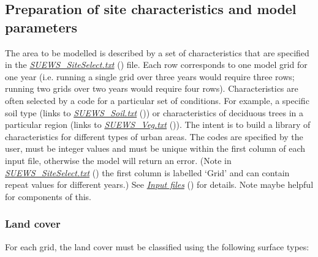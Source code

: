\documentclass[letterpaper,10pt,english]{sphinxmanual}
\begin{document}
\subsection{Preparation of site characteristics and model parameters}
\label{\detokenize{prepare-to-run-the-model:preparation-of-site-characteristics-and-model-parameters}}
The area to be modelled is described by a set of characteristics that
are specified in the {\hyperref[\detokenize{prepare-to-run-the-model:SUEWS_SiteSelect.txt}]{\emph{SUEWS\_SiteSelect.txt}}} ()
file. Each row corresponds to one model grid for one year (i.e. running
a single grid over three years would require three rows; running two
grids over two years would require four rows). Characteristics are often
selected by a code for a particular set of conditions. For example, a
specific soil type (links to {\hyperref[\detokenize{prepare-to-run-the-model:SUEWS_Soil.txt}]{\emph{SUEWS\_Soil.txt}}} ()) or
characteristics of deciduous trees in a particular region (links to
{\hyperref[\detokenize{prepare-to-run-the-model:SUEWS_Veg.txt}]{\emph{SUEWS\_Veg.txt}}} ()). The intent is to build a library of
characteristics for different types of urban areas. The codes are
specified by the user, must be integer values and must be unique within
the first column of each input file, otherwise the model will return an
error. (Note in {\hyperref[\detokenize{prepare-to-run-the-model:SUEWS_SiteSelect.txt}]{\emph{SUEWS\_SiteSelect.txt}}} () the
first column is labelled ‘Grid’ and can contain repeat values for
different years.) See {\hyperref[\detokenize{prepare-to-run-the-model:Input_files}]{\emph{Input files}}} () for details. Note
 maybe helpful for
components of this.


\subsubsection{Land cover}
\label{\detokenize{prepare-to-run-the-model:land-cover}}
For each grid, the land cover must be classified using the following
surface types:
\end{document}
